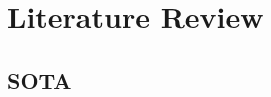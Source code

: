 \documentclass[CJK,aspectratio=169]{beamer}  %
\begin{document}
	
	\section{Literature Review}
	
	\subsection{SOTA}
	
\end{document}

